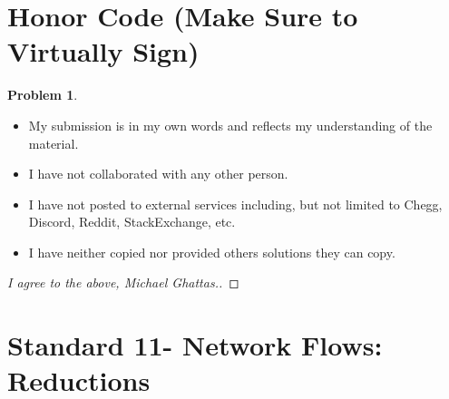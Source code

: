 \documentclass[11pt]{article}
\theoremstyle{definition}
\theoremstyle{definition}
\newtheorem{required}{Problem}
\theoremstyle{definition}
\begin{document}
\section{Honor Code (Make Sure to Virtually Sign)} \label{HonorCode}

\begin{required}
\noindent 
\begin{itemize}
\item My submission is in my own words and reflects my understanding of the material.
\item I have not collaborated with any other person.
\item I have not posted to external services including, but not limited to Chegg, Discord, Reddit, StackExchange, etc.
\item I have neither copied nor provided others solutions they can copy.
\end{itemize}

\end{required}

\begin{proof}[I agree to the above, Michael Ghattas.]
\end{proof}


\newpage
\section{Standard 11- Network Flows: Reductions}
\end{document}
